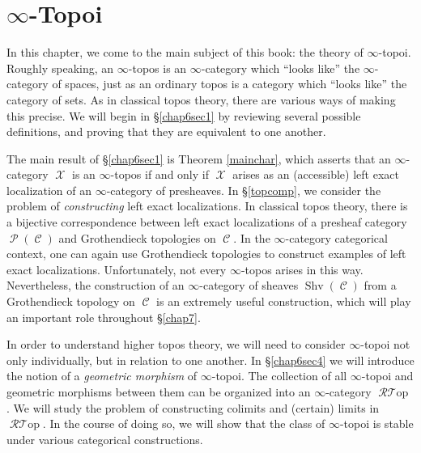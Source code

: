 \documentclass[12pt, final]{report}
\DeclareMathOperator{\Shv}{Shv}
\DeclareMathOperator{\RGeom}{\mathcal{R}{\mathcal T}op}
\DeclareMathOperator{\calC}{\mathcal{C}}
\DeclareMathOperator{\calX}{\mathcal{X}}
\DeclareMathOperator{\calP}{\mathcal{P}}
\theoremstyle{definition}
\begin{document}






\chapter{$\infty$-Topoi}\label{chap6}

\setcounter{theorem}{0}
\setcounter{subsection}{0}

In this chapter, we come to the main subject of this book: the theory of $\infty$-topoi.
Roughly speaking, an $\infty$-topos is an $\infty$-category which ``looks like'' the $\infty$-category of spaces, just as an ordinary topos is a category which ``looks like'' the category of sets. As in classical topos theory, there are various ways of making this precise. We will begin in \S \ref{chap6sec1} by reviewing several possible definitions, and proving that they are equivalent to one another.

The main result of \S \ref{chap6sec1} is Theorem \ref{mainchar}, which asserts that an $\infty$-category $\calX$ is an $\infty$-topos if and only if $\calX$ arises as an (accessible) left exact localization of an $\infty$-category of presheaves. In \S \ref{topcomp}, we consider the problem of {\em constructing} left exact localizations. In classical topos theory, there is a bijective correspondence between left exact localizations of a presheaf category $\calP(\calC)$ and Grothendieck topologies on $\calC$. In the $\infty$-category categorical context, one can again use Grothendieck topologies to construct examples of left exact localizations. 
Unfortunately, not every $\infty$-topos arises in this way. Nevertheless, the construction of an $\infty$-category of sheaves $\Shv(\calC)$ from a Grothendieck topology on $\calC$ is an extremely useful construction, which will play an important role throughout \S \ref{chap7}.

In order to understand higher topos theory, we will need to consider $\infty$-topoi not only individually, but in relation to one another. In \S \ref{chap6sec4} we will introduce the notion of a {\em geometric morphism} of $\infty$-topoi. The collection of all $\infty$-topoi and geometric morphisms between them can be organized into an $\infty$-category $\RGeom$. We will study the problem of constructing colimits and (certain) limits in $\RGeom$. In the course of doing so, we will show that the class of $\infty$-topoi is stable under various categorical constructions.
\end{document}

